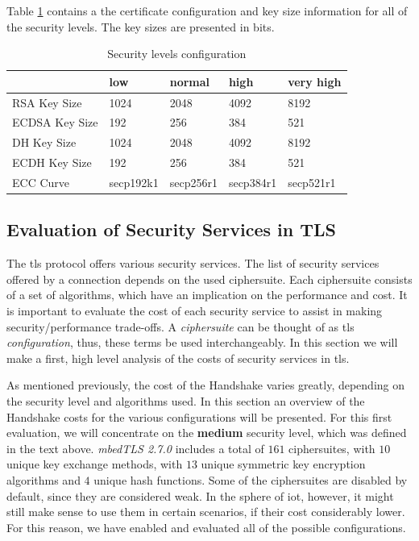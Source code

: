 \documentclass{llncs}
\begin{document}
Table \ref{table:sls-config-info} contains a the certificate configuration and key size information for all of the
security levels. The key sizes are presented in bits.

\begin{table}[]
\begin{tabular}{|l|l|l|l|l|}
\hline
               & \textbf{low} & \textbf{normal} & \textbf{high} & \textbf{very high} \\ \hline
RSA Key Size   & 1024         & 2048            & 4092          & 8192               \\ \hline
ECDSA Key Size & 192          & 256             & 384           & 521                \\ \hline
DH Key Size    & 1024         & 2048            & 4092          & 8192               \\ \hline
ECDH Key Size  & 192          & 256             & 384           & 521                \\ \hline
ECC Curve      & secp192k1    & secp256r1       & secp384r1     & secp521r1          \\ \hline
\end{tabular}
\centering \caption{\label{table:sls-config-info} Security levels configuration}
\end{table}

\subsection{Evaluation of Security Services in TLS} \label{sec:ss-overview}

The \gls{tls} protocol offers various security services. The list of security services offered by a connection
depends on the used ciphersuite. Each ciphersuite consists of a set of algorithms, which have an implication
on the performance and cost. It is important to evaluate the cost of each security service to assist in making
security/performance trade-offs. A \textit{ciphersuite} can be thought of as \gls{tls} \textit{configuration},
thus, these terms be used interchangeably. In this section we will make a first, high level analysis of the
costs of security services in \gls{tls}.

As mentioned previously, the cost of the Handshake varies greatly, depending on the security level and algorithms used.
In this section an overview of the Handshake costs for the various configurations will be presented. For this
first evaluation, we will concentrate on the \textbf{medium} security level, which was defined in the text above.
\textit{mbedTLS 2.7.0} includes a total of $161$ ciphersuites, with $10$ unique key exchange methods, with $13$ unique
symmetric key encryption algorithms and $4$ unique hash functions. Some of the ciphersuites are disabled by default,
since they are considered weak. In the sphere of \gls{iot}, however, it might still make sense to use them in certain
scenarios, if their cost considerably lower. For this reason, we have enabled and evaluated all of the possible configurations.
\end{document}
